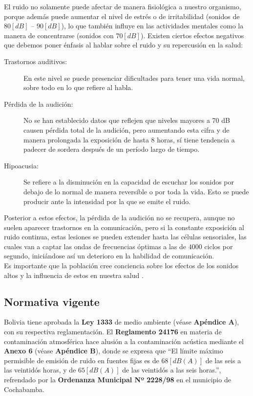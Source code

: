 \documentclass[letter,11pt]{article}
\begin{document}
El ruido no solamente puede afectar de manera fisiológica a nuestro organismo,
porque además puede aumentar el nivel de estrés o de irritabilidad (sonidos de
$80 [dB]$ – $90 [dB]$), lo que también influye en las actividades mentales como
la manera de concentrarse (sonidos con $70 [dB]$). Existen ciertos efectos
negativos que debemos poner énfasis al hablar sobre el ruido y su repercusión en
la salud:

\begin{description}
\item [Trastornos auditivos:]
En este nivel se puede presenciar dificultades para tener una vida normal, sobre
todo en lo que refiere al habla.

\item [Pérdida de la audición:]
No se han establecido datos que reflejen que niveles mayores a 70 dB causen
pérdida total de la audición, pero aumentando esta cifra y de manera prolongada
la exposición de hasta 8 horas, sí tiene tendencia a padecer de sordera después
de un período largo de tiempo.

\item [Hipoacusia:]
Se refiere a la disminución en la capacidad de escuchar los sonidos por debajo
de lo normal de manera reversible o por toda la vida. Esto se puede producir
ante la intensidad por la que se emite el ruido.
\end{description}

Posterior a estos efectos, la pérdida de la audición no se recupera, aunque no
suelen aparecer trastornos en la comunicación, pero si la constante exposición
al ruido continua, estas lesiones se pueden extender hasta las células
sensoriales, las cuales van a captar las ondas de frecuencias óptimas a las de
$4000$ ciclos por segundo, iniciándose así un deterioro en la habilidad de
comunicación.
\\

Es importante que la población cree conciencia sobre los efectos de los sonidos
altos y la influencia de estos en nuestra salud \cite{ELSEVIER}.

\subsection{Normativa vigente}

Bolivia tiene aprobada la \textbf{Ley 1333} de medio ambiente (véase
\textbf{Apéndice A}), con su respectiva reglamentación. El
\textbf{Reglamento 24176} en materia de contaminación atmosférica hace alusión
a la contaminación acústica mediante el \textbf{Anexo 6} (véase
\textbf{Apéndice B}), donde se expresa que ``El límite máximo permisible de
emisión de ruido en fuentes fijas es de $68 [dB(A)]$ de las seis a las veintidós
horas, y de $65 [dB(A)]$ de las veintidós a las seis horas.'', refrendado por
la \textbf{Ordenanza Municipal Nº 2228/98} en el municipio de Cochabamba.
\\
\end{document}
